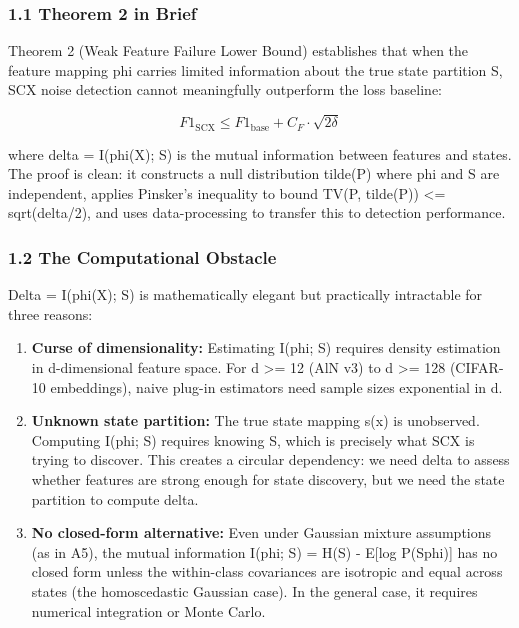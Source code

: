 \documentclass[
  12pt,
]{article}
\begin{document}
\subsubsection{1.1 Theorem 2 in Brief}\label{theorem-2-in-brief}

Theorem 2 (Weak Feature Failure Lower Bound) establishes that when the
feature mapping phi carries limited information about the true state
partition S, SCX noise detection cannot meaningfully outperform the loss
baseline:

\[F1_{\text{SCX}} \leq F1_{\text{base}} + C_F \cdot \sqrt{2\delta}\]

where delta = I(phi(X); S) is the mutual information between features
and states. The proof is clean: it constructs a null distribution
tilde(P) where phi and S are independent, applies Pinsker's inequality
to bound TV(P, tilde(P)) \textless= sqrt(delta/2), and uses
data-processing to transfer this to detection performance.

\subsubsection{1.2 The Computational
Obstacle}\label{the-computational-obstacle}

Delta = I(phi(X); S) is mathematically elegant but practically
intractable for three reasons:

\begin{enumerate}
\def\labelenumi{\arabic{enumi}.}
\item
  \textbf{Curse of dimensionality:} Estimating I(phi; S) requires
  density estimation in d-dimensional feature space. For d \textgreater=
  12 (AlN v3) to d \textgreater= 128 (CIFAR-10 embeddings), naive
  plug-in estimators need sample sizes exponential in d.
\item
  \textbf{Unknown state partition:} The true state mapping s(x) is
  unobserved. Computing I(phi; S) requires knowing S, which is precisely
  what SCX is trying to discover. This creates a circular dependency: we
  need delta to assess whether features are strong enough for state
  discovery, but we need the state partition to compute delta.
\item
  \textbf{No closed-form alternative:} Even under Gaussian mixture
  assumptions (as in A5), the mutual information I(phi; S) = H(S) -
  E{[}log P(S\textbar phi){]} has no closed form unless the within-class
  covariances are isotropic and equal across states (the homoscedastic
  Gaussian case). In the general case, it requires numerical integration
  or Monte Carlo.
\end{enumerate}
\end{document}

